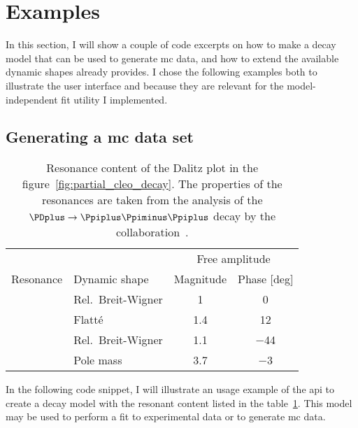     \section{Examples}

        In this section, I will show a couple of code excerpts on how to make a decay model that can be used to generate \ac{mc} data, and how to extend the available dynamic shapes  already provides.
        I chose the following examples both to illustrate the user interface and because they are relevant for the model-independent fit utility I implemented.

        \subsection{\texorpdfstring{Generating a \acs{mc} data set}{Generating a MC data set}}
        

        \begin{table}
            \centering
            \caption{Resonance content of the Dalitz plot in the figure~\ref{fig:partial_cleo_decay}. The properties of the resonances are taken from the analysis of the $\PDplus\to\Ppiplus\Ppiminus\Ppiplus$ decay by the \cleo{} collaboration~\cite{PhysRevD.76.012001}.}
            \label{tab:cleo_model}
            \begin{tabular}{llcc}
                \toprule
                            &                  &\multicolumn{2}{c}{Free amplitude}  \\ \cline{3-4}
                Resonance   &Dynamic shape     &Magnitude  &Phase [deg]\\
                \midrule
                \Prhozero{} &Rel.~Breit-Wigner &\num{1}    &\num{0}   \\
                \Pfnez{}    &Flatté            &\num{1.4}  &\num{12}  \\
                \Pfofzz{}   &Rel.~Breit-Wigner &\num{1.1}  &\num{-44} \\
                \Psigma{}   &Pole mass         &\num{3.7}  &\num{-3}  \\
                \bottomrule
            \end{tabular}
        \end{table}
        In the following code snippet, I will illustrate an usage example of the \ac{api} to create a decay model with the resonant content listed in the table~\ref{tab:cleo_model}.
        This model may be used to perform a fit to experimental data or to generate \ac{mc} data.

